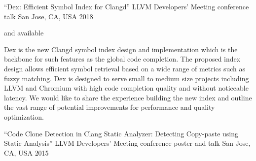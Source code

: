 
\begin{cventries}

  \cventry
    {``Dex: Efficient Symbol Index for Clangd''}
    {LLVM Developers' Meeting conference talk}
    {San Jose, CA, USA}
    {2018}
    {
      \begin{cvitems}
        \item {}
        and  available
        \item Dex is the new Clangd symbol index design and implementation
          which is the backbone for such features as the global code
          completion. The proposed index design allows efficient symbol
          retrieval based on a wide range of metrics such as fuzzy matching.
          Dex is designed to serve small to medium size projects including LLVM
          and Chromium with high code completion quality and without noticeable
          latency. We would like to share the experience building the new index
          and outline the vast range of potential improvements for performance
          and quality optimization.
      \end{cvitems}
    }

  \cventry
    {``Code Clone Detection in Clang Static Analyzer: Detecting Copy-paste using Static Analysis''}
    {LLVM Developers' Meeting conference poster and talk}
    {San Jose, CA, USA}
    {2015}
    {
      \begin{cvitems}
      \end{cvitems}
    }

\end{cventries}
